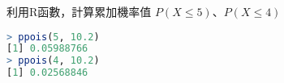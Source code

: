利用R函數，計算累加機率值 $P(X \leq 5)$、$P(X \leq 4)$

\begin{lstlisting}[language=R]
> ppois(5, 10.2)
[1] 0.05988766
> ppois(4, 10.2)
[1] 0.02568846
\end{lstlisting}